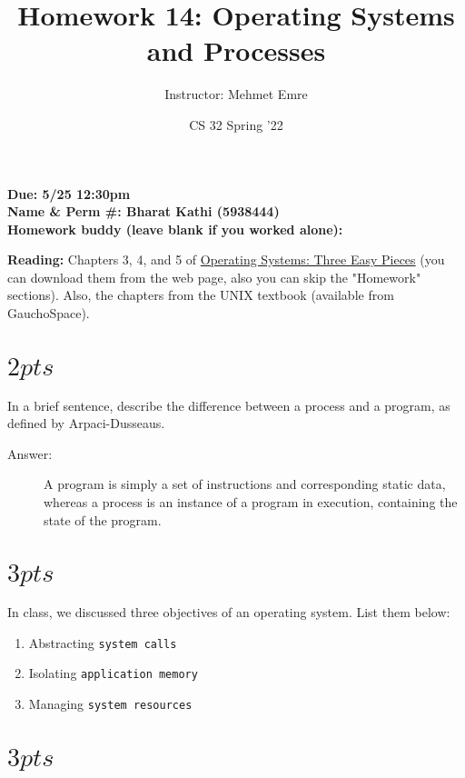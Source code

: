 \documentclass[11pt]{article}
\author{Instructor: Mehmet Emre}
\date{CS 32 Spring '22}
\title{Homework 14: Operating Systems and Processes}
\begin{document}
\maketitle
\textbf{Due: 5/25 12:30pm} \\ 
\vspace{1em}
\textbf{Name \& Perm \#: Bharat Kathi (5938444)} \\ 
\textbf{Homework buddy (leave blank if you worked alone):}

\textbf{Reading:} Chapters 3, 4, and 5 of \href{https://pages.cs.wisc.edu/\~remzi/OSTEP/}{Operating Systems: Three Easy Pieces} (you can
download them from the web page, also you can skip the "Homework" sections).
Also, the chapters from the UNIX textbook (available from GauchoSpace).

\section{\(2 pts\)}
\label{sec:org71cf4d4}

In a brief sentence, describe the difference between a process and a program, as
defined by Arpaci-Dusseaus.

\begin{description}
    \item[Answer:] A program is simply a set of instructions and corresponding static data, whereas a process is an instance of a program in execution, containing the state of the program.
\end{description}

\section{\(3 pts\)}
\label{sec:orgf9eff4f}

In class, we discussed three objectives of an operating system. List them below:

\begin{enumerate}
\item Abstracting \texttt{system calls}
\vspace{2em}
\item Isolating \texttt{application memory}
\vspace{2em}
\item Managing \texttt{system resources}
\vspace{2em}
\end{enumerate}

\section{\(3 pts\)}
\label{sec:org8a8a269}
\end{document}
